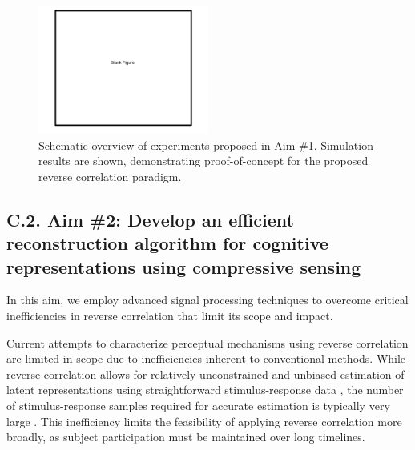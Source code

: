 \documentclass[11pt, notitlepage]{article} %
\begin{document}
\begin{figure}[h] %
	\centering
	\includegraphics[width=0.5\textwidth]{Figures/BlankFigure.pdf}
	\caption{Schematic overview of experiments proposed in Aim \#1.
	Simulation results are shown, demonstrating proof-of-concept
	for the proposed reverse correlation paradigm.}
	\label{fig:experiment}
\end{figure}

\subsection*{C.2. Aim \#2: Develop an efficient reconstruction algorithm for cognitive representations using compressive sensing}

In this aim, we employ advanced signal processing techniques to overcome critical inefficiencies
in reverse correlation that limit its scope and impact.

Current attempts to characterize perceptual mechanisms using reverse correlation
are limited in scope due to inefficiencies inherent to conventional methods.
While reverse correlation allows for relatively unconstrained and unbiased
estimation of latent representations using straightforward stimulus-response data
\cite{marmarelisWhiteNoiseMethodSystem1978,nishimotoReceptiveFieldProperties2006},
the number of stimulus-response samples required for accurate estimation
is typically very large \cite{mineaultImprovedClassificationImages2009}.
This inefficiency limits the feasibility of applying reverse correlation more broadly,
as subject participation must be maintained over long timelines.
\end{document}
